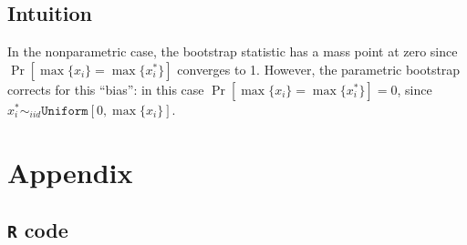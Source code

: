 \documentclass[12pt]{article}
\begin{document}
\subsection{Intuition} In the nonparametric case, the bootstrap statistic has a mass point at zero since $\Pr[\max\{x_i\} = \max\{x_i^*\}]$ converges to 1. However, the parametric bootstrap corrects for this ``bias'': in this case $\Pr[\max\{x_i\} = \max\{x_i^*\}] = 0$, since $x_i^* \sim_{iid} \texttt{Uniform}[0,\max\{x_i\}].$

\newpage

\section{Appendix}

\subsection{\texttt{R} code}
\end{document}

